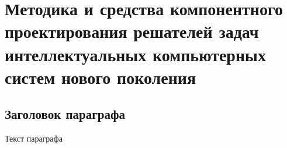 \chapter{Методика и средства компонентного проектирования решателей задач интеллектуальных компьютерных систем нового поколения}
\label{chapter_ps_design}


\section{Заголовок параграфа}
Текст параграфа

%